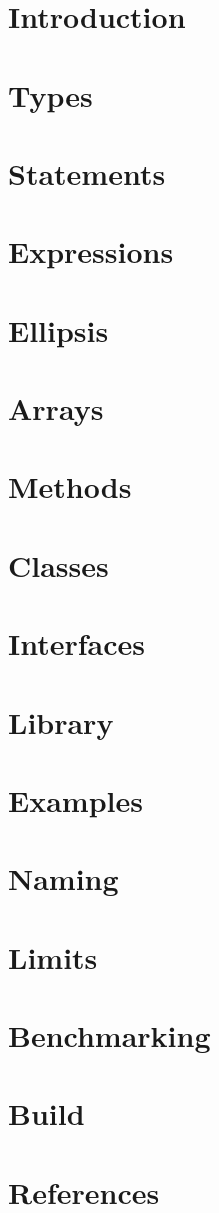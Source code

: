 \documentclass{book}
\newcommand\code[1]{}
\newcommand\Chapter[1]{\chapter{#1}}
\begin{document}




\frontmatter
\tableofcontents

\mainmatter

\chapter*{Introduction}


\Chapter{Types}

\Chapter{Statements}

\Chapter{Expressions}

\Chapter{Ellipsis}

\Chapter{Arrays}

\Chapter{Methods}

\Chapter{Classes}

\Chapter{Interfaces}

\Chapter{Library}

\appendix

\def\code#1{\VerbatimInput[obeytabs, tabsize = 4]{#1}}

\Chapter{Examples}

\Chapter{Naming}

\Chapter{Limits}

\Chapter{Benchmarking}

\def\code#1{}

\Chapter{Build}

\Chapter{References}

\backmatter
\printindex


\end{document}
